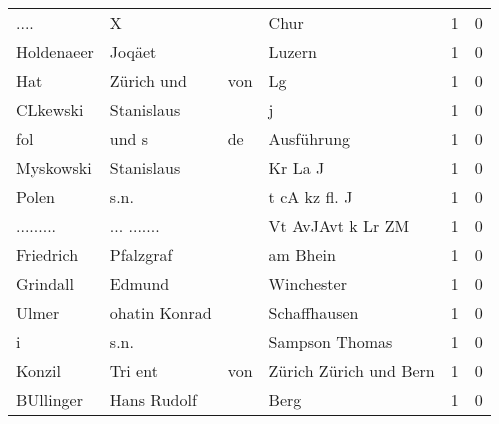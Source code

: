 \begin{center}
\begin{tiny}
\begin{longtabu}{llllrr}
                     .... &                                  X &             &                                        Chur &          1 &         0 \\
               Holdenaeer &                             Joqäet &             &                                      Luzern &          1 &         0 \\
                      Hat &                         Zürich und &         von &                                          Lg &          1 &         0 \\
                 CLkewski &                         Stanislaus &             &                                           j &          1 &         0 \\
                      fol &                              und s &          de &                                  Ausführung &          1 &         0 \\
                Myskowski &                         Stanislaus &             &                                     Kr La J &          1 &         0 \\
                    Polen &                               s.n. &             &                               t cA kz fl. J &          1 &         0 \\
                ......... &                        ... ....... &             &                           Vt AvJAvt k Lr ZM &          1 &         0 \\
                Friedrich &                          Pfalzgraf &             &                                    am Bhein &          1 &         0 \\
                 Grindall &                             Edmund &             &                                  Winchester &          1 &         0 \\
                    Ulmer &                      ohatin Konrad &             &                                Schaffhausen &          1 &         0 \\
                        i &                               s.n. &             &                              Sampson Thomas &          1 &         0 \\
                   Konzil &                            Tri ent &         von &                      Zürich Zürich und Bern &          1 &         0 \\
                BUllinger &                        Hans Rudolf &             &                                        Berg &          1 &         0 \\

\end{longtabu}
\end{tiny}
\end{center}
